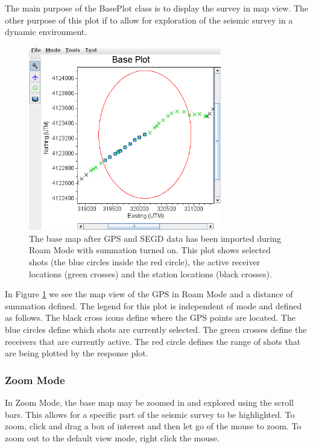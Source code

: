 \documentclass[12pt]{article}
\begin{document}
The main purpose of the BasePlot class is to display the survey in map view. The other purpose of this plot if to allow for exploration of the seismic survey in a dynamic environment. 

\begin{figure}[H]
\centering
\includegraphics[width=0.75\textwidth]{./figs/fig1.png}
\caption{The base map after GPS and SEGD data has been imported during Roam Mode with summation turned on. This plot shows selected shots (the blue circles inside the red circle), the active receiver locations (green crosses) and the station locations (black crosses).}
\label{FIG:BP}
\end{figure}

In Figure \ref{FIG:BP} we see the map view of the GPS in Roam Mode and a distance of summation defined. The legend for this plot is independent of mode and defined as follows. The black cross icons define where the GPS points are located. The blue circles define which shots are currently selected. The green crosses define the receivers that are currently active. The red circle defines the range of shots that are being plotted by the response plot.

\subsubsection{Zoom Mode}

In Zoom Mode, the base map may be zoomed in and explored using the scroll bars. This allows for a specific part of the seismic survey to be highlighted. To zoom, click and drag a box of interest and then let go of the mouse to zoom. To zoom out to the default view mode, right click the mouse. 
\end{document}
